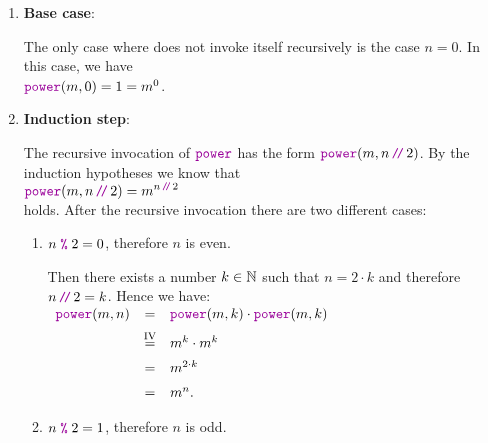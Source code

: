 \begin{enumerate}
\item \textbf{Base case}:

      The only case where  does not invoke itself recursively is the case $n = 0$.  
      In this case, we have
      \\[0.2cm]
      \hspace*{1.3cm} 
      $\mytt{power}(m,0) = 1 =  m^0$. \mycheck
\item \textbf{Induction step}:

      The recursive invocation of $\mytt{power}$ has the form
      $\mytt{power}(m,n \dv 2)$.  By the induction hypotheses we know that 
      \\[0.2cm]
      \hspace*{1.3cm}
      $\displaystyle \mytt{power}(m,n \dv 2) = m^{n \dvv 2}$ 
      \\[0.2cm]
      holds.  After the recursive invocation there are two different cases:
      \begin{enumerate}
      \item $n \;\mytt{\%}\; 2 = 0$, therefore $n$ is even.

            Then there exists a number $k \in {\mathbb N}$ such that $n = 2 \cdot k$ and therefore
            $n \dv 2 = k$.
            Hence we have:
            \\[0.2cm]
            \hspace*{1.3cm}
           $ 
            \begin{array}{lcl}
            \mytt{power}(m,n) & = & \mytt{power}(m,k) \cdot \mytt{power}(m,k) \\[0.2cm]
                                & \stackrel{\mathrm{IV}}{=} & m^k \cdot m^k  \\[0.2cm]
                                & = & m^{2\cdot k} \\[0.2cm]
                                & = & m^{n}.
            \end{array}
            $            
      \item $n \;\mytt{\%}\; 2 = 1$, therefore $n$ is odd.


\end{enumerate}
\end{enumerate}
